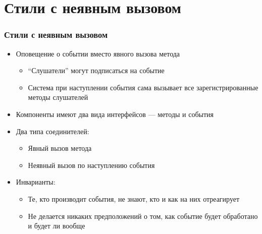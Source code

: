 \documentclass[xetex,mathserif,serif]{beamer}
\begin{document}
	\section{Стили с неявным вызовом}

	\begin{frame}
		\frametitle{Стили с неявным вызовом}
		\begin{itemize}
			\item Оповещение о событии вместо явного вызова метода
			\begin{itemize}
				\item ``Слушатели'' могут подписаться на событие
				\item Система при наступлении события сама вызывает все зарегистрированные методы слушателей
			\end{itemize}
			\item Компоненты имеют два вида интерфейсов --- методы и события
			\item Два типа соединителей:
			\begin{itemize}
				\item Явный вызов метода
				\item Неявный вызов по наступлению события
			\end{itemize}
			\item Инварианты:
			\begin{itemize}
				\item Те, кто производит события, не знают, кто и как на них отреагирует
				\item Не делается никаких предположений о том, как событие будет обработано и будет ли вообще
			\end{itemize}
		\end{itemize}
	\end{frame}
\end{document}
